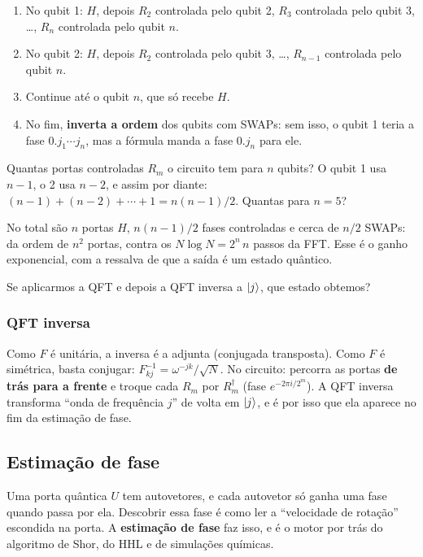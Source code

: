 \begin{enumerate}
\def\labelenumi{\arabic{enumi}.}
\tightlist
\item
  No qubit 1: \(H\), depois \(R_2\) controlada pelo qubit 2, \(R_3\) controlada pelo qubit 3, \ldots, \(R_n\) controlada pelo qubit \(n\).
\item
  No qubit 2: \(H\), depois \(R_2\) controlada pelo qubit 3, \ldots, \(R_{n-1}\) controlada pelo qubit \(n\).
\item
  Continue até o qubit \(n\), que só recebe \(H\).
\item
  No fim, \textbf{inverta a ordem} dos qubits com SWAPs: sem isso, o qubit 1 teria a fase \(0.j_1\cdots j_n\), mas a fórmula manda a fase \(0.j_n\) para ele.
\end{enumerate}

Quantas portas controladas \(R_m\) o circuito tem para \(n\) qubits? O qubit 1 usa \(n-1\), o 2 usa \(n-2\), e assim por diante: \((n-1)+(n-2)+\cdots+1 = n(n-1)/2\). Quantas para \(n=5\)?

No total são \(n\) portas \(H\), \(n(n-1)/2\) fases controladas e cerca de \(n/2\) SWAPs: da ordem de \(n^2\) portas, contra os \(N\log N = 2^n\,n\) passos da FFT. Esse é o ganho exponencial, com a ressalva de que a saída é um estado quântico.

Se aplicarmos a QFT e depois a QFT inversa a \(\left|{j}\right>\), que estado obtemos?

\subsubsection{QFT inversa}\label{qft-inversa}

Como \(F\) é unitária, a inversa é a adjunta (conjugada transposta). Como \(F\) é simétrica, basta conjugar: \(F^{-1}_{kj}=\omega^{-jk}/\sqrt N\). No circuito: percorra as portas \textbf{de trás para a frente} e troque cada \(R_m\) por \(R_m^\dagger\) (fase \(e^{-2\pi i/2^m}\)). A QFT inversa transforma ``onda de frequência \(j\)'' de volta em \(\left|{j}\right>\), e é por isso que ela aparece no fim da estimação de fase.

\subsection{Estimação de fase}
Uma porta quântica \(U\) tem autovetores, e cada autovetor só ganha uma fase quando passa por ela. Descobrir essa fase é como ler a ``velocidade de rotação'' escondida na porta. A \textbf{estimação de fase} faz isso, e é o motor por trás do algoritmo de Shor, do HHL e de simulações químicas.

